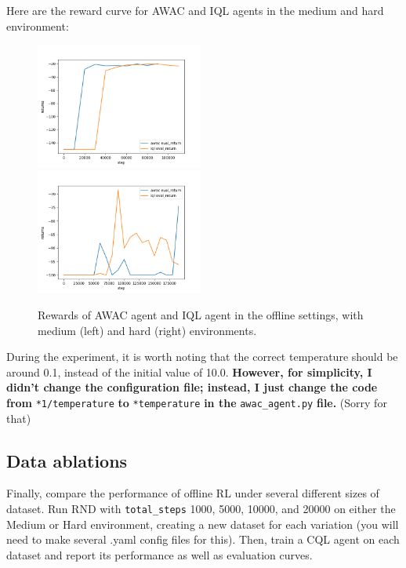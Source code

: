 \documentclass{article}
\begin{document}
\MYSOLUTION Here are the reward curve for AWAC and IQL agents in the medium and hard environment:

\begin{figure}[H]
    \centering
    \includegraphics[width=0.49\textwidth]{../report/assets/4.2-medium.png}~
    \includegraphics[width=0.49\textwidth]{../report/assets/4.2-hard.png}
    \caption{Rewards of AWAC agent and IQL agent in the offline settings, with medium (left) and hard (right) environments.}
\end{figure}

During the experiment, it is worth noting that the correct temperature should be around 0.1, instead of the initial value of 10.0. \textbf{However, for simplicity, I didn't change the configuration file; instead, I just change the code from }\verb|*1/temperature| \textbf{to} \verb|*temperature| \textbf{in the} \verb|awac_agent.py| \textbf{file.} (Sorry for that)

\subsection{Data ablations}
Finally, compare the performance of offline RL under several different sizes of dataset. Run RND with \verb+total_steps+ 1000, 5000, 10000, and 20000 on either the Medium or Hard environment, creating a new dataset for each variation (you will need to make several .yaml config files for this). Then, train a CQL agent on each dataset and report its performance as well as evaluation curves.
\end{document}
